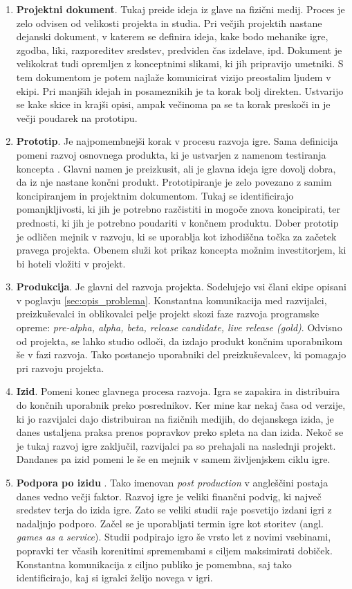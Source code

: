 \documentclass[12pt,a4paper,twoside]{book}
\begin{document}
\begin{enumerate}
	\item \textbf{Projektni dokument}. Tukaj preide ideja iz glave na fizični medij. Proces je zelo odvisen od velikosti projekta in studia. Pri večjih projektih nastane dejanski dokument, v katerem se definira ideja, kake bodo mehanike igre, zgodba, liki, razporeditev sredstev, predviden čas izdelave, ipd. Dokument je velikokrat tudi opremljen z konceptnimi slikami, ki jih pripravijo umetniki. S tem dokumentom je potem najlaže komunicirat vizijo preostalim ljudem v ekipi. Pri manjših idejah in posameznikih je ta korak bolj direkten. Ustvarijo se kake skice in krajši opisi, ampak večinoma pa se ta korak preskoči in je večji poudarek na prototipu.
	\item \textbf{Prototip}. Je najpomembnejši korak v procesu razvoja igre. Sama definicija pomeni razvoj osnovnega produkta, ki je ustvarjen z namenom testiranja koncepta \cite{blackwell2015prototype}. Glavni namen je preizkusit, ali je glavna ideja igre dovolj dobra, da iz nje nastane končni produkt. Prototipiranje je zelo povezano z samim koncipiranjem in projektnim dokumentom. Tukaj se identificirajo pomanjkljivosti, ki jih je potrebno razčistiti in mogoče znova koncipirati, ter prednosti, ki jih je potrebno poudariti v končnem produktu. Dober prototip je odličen mejnik v razvoju, ki se uporablja kot izhodiščna točka za začetek pravega projekta. Obenem služi kot prikaz koncepta možnim investitorjem, ki bi hoteli vložiti v projekt. 
	\item \textbf{Produkcija}. Je glavni del razvoja projekta. Sodelujejo vsi člani ekipe opisani v poglavju \ref{sec:opis_problema}. Konstantna komunikacija med razvijalci, preizkuševalci in oblikovalci pelje projekt skozi faze razvoja programske opreme: \textit{pre-alpha, alpha, beta, release candidate, live release (gold)}. Odvisno od projekta, se lahko studio odloči, da izdajo produkt končnim uporabnikom še v fazi razvoja. Tako postanejo uporabniki del preizkuševalcev, ki pomagajo pri razvoju projekta.
	\item \textbf{Izid}. Pomeni konec glavnega procesa razvoja. Igra se zapakira in distribuira do končnih uporabnik preko posrednikov. Ker mine kar nekaj časa od verzije, ki jo razvijalci dajo distribuiran na fizičnih medijih, do dejanskega izida, je danes ustaljena praksa prenos popravkov preko spleta na dan izida. Nekoč se je tukaj razvoj igre zaključil, razvijalci pa so prehajali na naslednji projekt. Dandanes pa izid pomeni le še en mejnik v samem življenjskem ciklu igre.
	\item \textbf{Podpora po izidu} . Tako imenovan \textit{post production} v angleščini postaja danes vedno večji faktor. Razvoj igre je veliki finančni podvig, ki največ sredstev terja do izida igre. Zato se veliki studii raje posvetijo izdani igri z nadaljnjo podporo. Začel se je uporabljati termin igre kot storitev (angl. \textit{games as a service}). Studii podpirajo igro še vrsto let z novimi vsebinami, popravki ter včasih korenitimi spremembami s ciljem maksimirati dobiček. Konstantna komunikacija z ciljno publiko je pomembna, saj tako identificirajo, kaj si igralci želijo novega v igri.
\end{enumerate}
\end{document}
